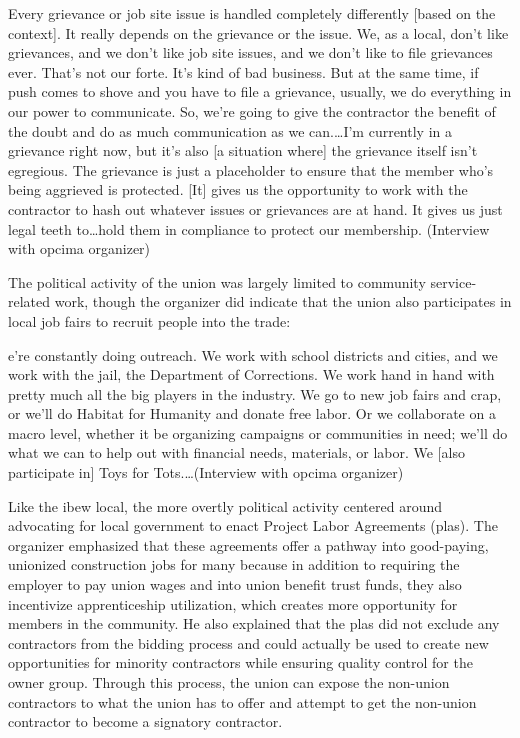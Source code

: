 \documentclass[12pt]{article}
\renewenvironment{quote}
  {\list{}{\leftmargin=\parindent\rightmargin=0pt}%
   \item\relax}
  {\endlist}
\begin{document}
\begin{quote}
Every grievance or job site issue is handled completely differently [based on the context]. It really depends on the grievance or the issue. We, as a local, don't like grievances, and we don't like job site issues, and we don't like to file grievances ever. That's not our forte. It's kind of bad business. But at the same time, if push comes to shove and you have to file a grievance, usually, we do everything in our power to communicate. So, we're going to give the contractor the benefit of the doubt and do as much communication as we can.\ldots{}I'm currently in a grievance right now, but it's also [a situation where] the grievance itself isn't egregious. The grievance is just a placeholder to ensure that the member who's being aggrieved is protected. [It] gives us the opportunity to work with the contractor to hash out whatever issues or grievances are at hand. It gives us just legal teeth to\ldots{}hold them in compliance to protect our membership. (Interview with \acrshort{opcima} organizer)
\end{quote}

The political activity of the union was largely limited to community service-related work, though the organizer did indicate that the union also participates in local job fairs to recruit people into the trade:

\begin{quote}
[W]e're constantly doing outreach. We work with school districts and cities, and we work with the jail, the Department of Corrections. We work hand in hand with pretty much all the big players in the industry. We go to new job fairs and crap, or we'll do Habitat for Humanity and donate free labor. Or we collaborate on a macro level, whether it be organizing campaigns or communities in need; we'll do what we can to help out with financial needs, materials, or labor. We [also participate in] Toys for Tots.\ldots (Interview with \acrshort{opcima} organizer)
\end{quote}

Like the \acrshort{ibew} local, the more overtly political activity centered around advocating for local government to enact Project Labor Agreements (\acrshort{pla}s). The organizer emphasized that these agreements offer a pathway into good-paying, unionized construction jobs for many because in addition to requiring the employer to pay union wages and into union benefit trust funds, they also incentivize apprenticeship utilization, which creates more opportunity for members in the community. He also explained that the \acrshort{pla}s did not exclude any contractors from the bidding process and could actually be used to create new opportunities for minority contractors while ensuring quality control for the owner group. Through this process, the union can expose the non-union contractors to what the union has to offer and attempt to get the non-union contractor to become a signatory contractor.
\end{document}
